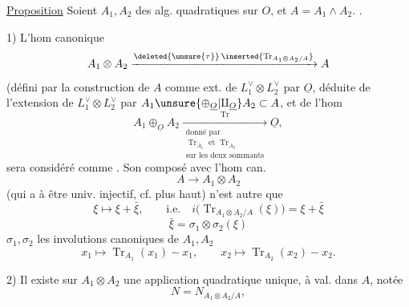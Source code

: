 \uline{Proposition} Soient $A_1,A_2$ des alg. quadratiques sur $O$, et $A=A_1\wedge A_2$. .

1)  L'hom canonique
\[
 A_1\otimes A_2\xrightarrow{\deleted{\unsure{\tau}}\,\inserted{\operatorname{Tr}_{A_1\otimes A_2/A}}}A
\]
(défini par la construction de $A$ comme ext. de $L_1^\vee\otimes L_2^\vee$ par $\underline O$, déduite de l'extension  de $L_1^\vee\otimes L_2^\vee$ par $A_1\unsure{\oplus_{\underline O}|\amalg_{\underline O}}A_2\subset A$,  et de l'hom
\[
 A_1\oplus_{\underline O}A_2\xrightarrow[\substack{\text{donné par}\\ \operatorname{Tr}_{A_1}\text{ et }\operatorname{Tr}_{A_2}\\\text{sur les deux sommants}}]{\operatorname{Tr}}\underline O,
\]
sera considéré comme .
Son composé avec l'hom can.
\[
 A\longrightarrow A_1\otimes A_2
\]
(qui a  à être univ. injectif, cf. plus haut)  n'est autre que
\[
 \xi\longmapsto\xi+\bar\xi,\qquad\text{i.e.}\quad
 \boxed{i\bigl(\operatorname{Tr}_{A_1\otimes A_2/A}(\xi)\bigr)=\xi+\bar\xi}
\]
\[
 \bar\xi=\sigma_1\otimes\sigma_2(\xi)
\]
$\sigma_1,\sigma_2$ les involutions canoniques de $A_1,A_2$
\[
 x_1\longmapsto\operatorname{Tr}_{A_1}(x_1)-x_1,\qquad
 x_2\longmapsto\operatorname{Tr}_{A_2}(x_2)-x_2.
\]

2) Il existe sur $A_1\otimes A_2$ une application quadratique unique, à val. dans $A$, notée
\[
 N=N_{A_1\otimes A_2/A},
\]
